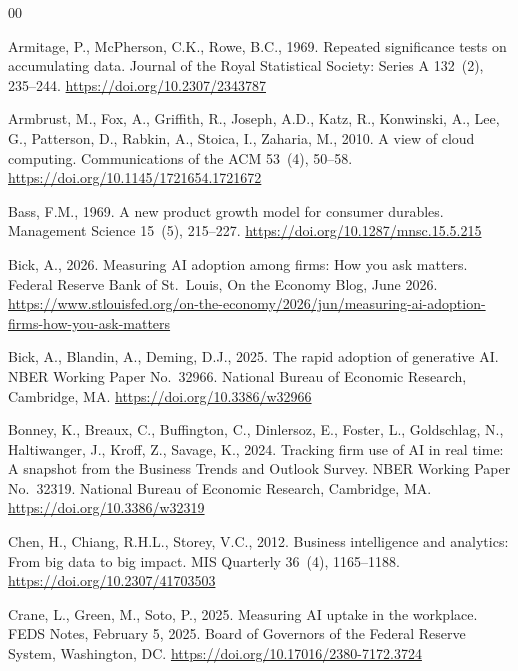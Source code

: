 \documentclass[review,authoryear,12pt]{elsarticle}
\begin{document}

\begin{thebibliography}{00}

Armitage, P., McPherson, C.K., Rowe, B.C., 1969. Repeated significance tests on accumulating data. Journal of the Royal Statistical Society: Series A 132~(2), 235--244. \url{https://doi.org/10.2307/2343787}

Armbrust, M., Fox, A., Griffith, R., Joseph, A.D., Katz, R., Konwinski, A., Lee, G., Patterson, D., Rabkin, A., Stoica, I., Zaharia, M., 2010. A view of cloud computing. Communications of the ACM 53~(4), 50--58. \url{https://doi.org/10.1145/1721654.1721672}

Bass, F.M., 1969. A new product growth model for consumer durables. Management Science 15~(5), 215--227. \url{https://doi.org/10.1287/mnsc.15.5.215}

Bick, A., 2026. Measuring AI adoption among firms: How you ask matters. Federal Reserve Bank of St.\ Louis, On the Economy Blog, June 2026. \url{https://www.stlouisfed.org/on-the-economy/2026/jun/measuring-ai-adoption-firms-how-you-ask-matters}

Bick, A., Blandin, A., Deming, D.J., 2025. The rapid adoption of generative AI. NBER Working Paper No.\ 32966. National Bureau of Economic Research, Cambridge, MA. \url{https://doi.org/10.3386/w32966}

Bonney, K., Breaux, C., Buffington, C., Dinlersoz, E., Foster, L., Goldschlag, N., Haltiwanger, J., Kroff, Z., Savage, K., 2024. Tracking firm use of AI in real time: A snapshot from the Business Trends and Outlook Survey. NBER Working Paper No.\ 32319. National Bureau of Economic Research, Cambridge, MA. \url{https://doi.org/10.3386/w32319}

Chen, H., Chiang, R.H.L., Storey, V.C., 2012. Business intelligence and analytics: From big data to big impact. MIS Quarterly 36~(4), 1165--1188. \url{https://doi.org/10.2307/41703503}

Crane, L., Green, M., Soto, P., 2025. Measuring AI uptake in the workplace. FEDS Notes, February 5, 2025. Board of Governors of the Federal Reserve System, Washington, DC. \url{https://doi.org/10.17016/2380-7172.3724}


\end{thebibliography}
\end{document}
